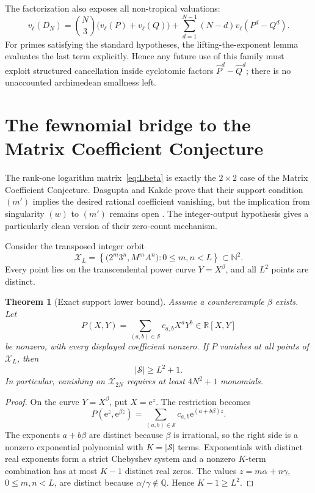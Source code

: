 \documentclass[11pt]{article}
\newcommand{\N}{\mathbb N}
\newcommand{\Q}{\mathbb Q}
\newcommand{\R}{\mathbb R}
\newcommand{\e}{\mathrm e}
\newcommand{\1}{\mathbf 1}
\theoremstyle{plain}
\newtheorem{theorem}{Theorem}[section]
\theoremstyle{definition}
\theoremstyle{remark}
\begin{document}
The factorization also exposes all non-tropical valuations:
\begin{equation}\label{eq:progression-valuation}
 v_\ell(D_N)=\binom N3\bigl(v_\ell(P)+v_\ell(Q)\bigr)
 +\sum_{d=1}^{N-1}(N-d)v_\ell(P^d-Q^d).
\end{equation}
For primes satisfying the standard hypotheses, the lifting-the-exponent
lemma evaluates the last term explicitly.  Hence any future use of this
family must exploit structured cancellation inside cyclotomic factors
$\widehat P^d-\widehat Q^d$; there is no unaccounted archimedean smallness left.

\section{The fewnomial bridge to the Matrix Coefficient Conjecture}
\label{sec:fewnomial}

The rank-one logarithm matrix~\eqref{eq:Lbeta} is exactly the $2\times2$ case
of the Matrix Coefficient Conjecture.  Dasgupta and Kakde prove that their
support condition $(m')$ implies the desired rational coefficient vanishing,
but the implication from singularity $(w)$ to $(m')$ remains open
\cite{DasguptaKakde}.  The integer-output hypothesis gives a particularly
clean version of their zero-count mechanism.

Consider the transposed integer orbit
\begin{equation}\label{eq:fewnomial-grid}
 \mathcal X_L=
 \left\{\bigl(2^m3^n,M^mA^n\bigr):0\le m,n<L\right\}
 \subset\N^2.
\end{equation}
Every point lies on the transcendental power curve $Y=X^\beta$, and all
$L^2$ points are distinct.

\begin{theorem}[Exact support lower bound]\label{thm:support-lower}
Assume a counterexample $\beta$ exists.  Let
\[
 P(X,Y)=\sum_{(a,b)\in\mathcal S}c_{a,b}X^aY^b
 \in\R[X,Y]
\]
be nonzero, with every displayed coefficient nonzero.  If $P$ vanishes at all
points of $\mathcal X_L$, then
\begin{equation}\label{eq:support-lower}
 |\mathcal S|\ge L^2+1.
\end{equation}
In particular, vanishing on $\mathcal X_{2N}$ requires at least
$4N^2+1$ monomials.
\end{theorem}

\begin{proof}
On the curve $Y=X^\beta$, put $X=\e^z$.  The restriction becomes
\begin{equation}\label{eq:exp-polynomial}
 P(\e^z,\e^{\beta z})
 =\sum_{(a,b)\in\mathcal S}c_{a,b}\e^{(a+b\beta)z}.
\end{equation}
The exponents $a+b\beta$ are distinct because $\beta$ is irrational, so the
right side is a nonzero exponential polynomial with
$K=|\mathcal S|$ terms.  Exponentials with distinct real exponents form a
strict Chebyshev system and a nonzero $K$-term combination has at most
$K-1$ distinct real zeros.  The values
$z=m\alpha+n\gamma$, $0\le m,n<L$, are distinct because
$\alpha/\gamma\notin\Q$.  Hence $K-1\ge L^2$.
\end{proof}
\end{document}
